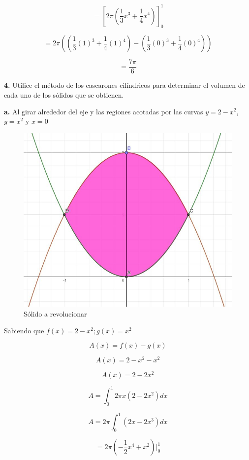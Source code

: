 \documentclass[12pt]{article}
\begin{document}
\begin{flushleft}
$$=\left[2\pi\left ( \frac{1}{3}x^{3}+\frac{1}{4} x^{4}\right )\right]_{0}^{1}$$

$$=2\pi\left(\left ( \frac{1}{3}\left ( 1 \right )^{3}+\frac{1}{4} \left (1 \right )^{4}\right )-\left ( \frac{1}{3}\left ( 0\right )^{3}+\frac{1}{4} \left (0 \right )^{4}\right )\right)$$


$$=\frac{7\pi}{6}$$


\newpage

\textbf{4.}  Utilice el método de los cascarones cilíndricos para determinar el volumen de cada uno de los sólidos que se obtienen.

\textbf{a. }Al girar alrededor del eje y las regiones acotadas por las curvas $y=2-x^{2}$, $y=x^{2}$ y $x=0$


\begin{figure}[H]
    \centering
    \includegraphics[scale=0.38]{B4.jpeg}
    \caption{Sólido a revolucionar}
    \label{Solido a revolucionar}
\end{figure}


Sabiendo que $f(x)=2-x^{2};g(x)=x^{2}$


$$A(x) = f(x)-g(x)$$


$$A(x) =2-x^{2}-x^{2}$$


$$A(x) =2-2x^{2}$$


$$A=\int_{0}^{1}2\pi x(2-2x^{2})dx$$


$$A=2\pi\int_{0}^{1} (2x-2x^{3})dx$$


$$=2\pi\left ( -\frac{1}{2}x^{4}+x^{2}\right )|_{0}^{1}$$



\end{flushleft}
\end{document}
